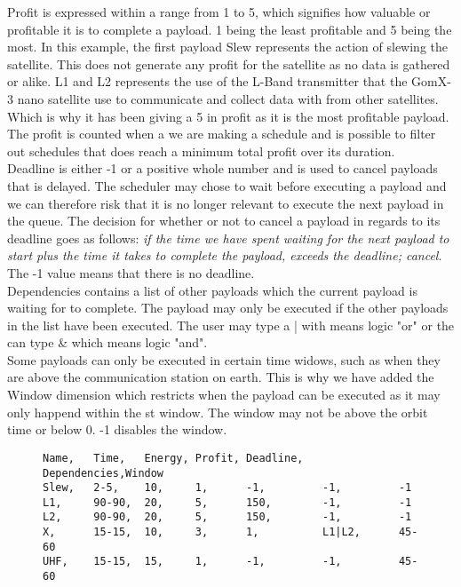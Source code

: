 Profit is expressed within a range from 1 to 5, which signifies how valuable or profitable it is to complete a payload.
1 being the least profitable and 5 being the most.
In this example, the first payload Slew represents the action of slewing the satellite.
This does not generate any profit for the satellite as no data is gathered or alike.
L1 and L2 represents the use of the L-Band transmitter that the GomX-3 nano satellite use to communicate and collect data with from other satellites.
Which is why it has been giving a 5 in profit as it is the most profitable payload.
The profit is counted when a we are making a schedule and is possible to filter out schedules that does reach a minimum total profit over its duration.\\
Deadline is either -1 or a positive whole number and is used to cancel payloads that is delayed.
The scheduler may chose to wait before executing a payload and we can therefore risk that it is no longer relevant to execute the next payload in the queue.
The decision for whether or not to cancel a payload in regards to its deadline goes as follows: \textit{if the time we have spent waiting for the next payload to start plus the time it takes to complete the payload, exceeds the deadline; cancel}.\\
The -1 value means that there is no deadline.\\
Dependencies contains a list of other payloads which the current payload is waiting for to complete.
The payload may only be executed if the other payloads in the list have been executed.
The user may type a | with means logic "or" or the can type \& which means logic "and".\\
Some payloads can only be executed in certain time widows, such as when they are above the communication station on earth.
This is why we have added the Window dimension which restricts when the payload can be executed as it may only happend within the st window.
The window may not be above the orbit time or below 0.
-1 disables the window.
\begin{figure}[H]
\begin{lstlisting}[caption={An example of how five payloads can be defined}, label=lst:csv, language=text]
Name,	Time,	Energy,	Profit,	Deadline,	Dependencies,Window
Slew,	2-5,	10,		1,		-1,			-1,			-1
L1,		90-90,	20,		5,		150,		-1,			-1
L2,		90-90,	20,		5,		150,		-1,			-1
X,		15-15,	10,		3,		1,			L1|L2,		45-60
UHF,	15-15,	15,		1,		-1,			-1,			45-60
\end{lstlisting}
\end{figure}

